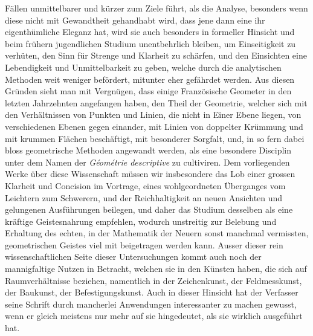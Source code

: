 %
Fällen unmittelbarer und kürzer zum Ziele führt, als die Analyse, besonders wenn diese nicht mit Gewandtheit gehandhabt wird, dass jene dann eine ihr eigenthümliche Eleganz hat, wird sie auch besonders in formeller Hinsicht und beim frühern jugendlichen Studium unentbehrlich bleiben, um Einseitigkeit zu verhüten, den Sinn für Strenge und Klarheit zu schärfen, und den Einsichten eine Lebendigkeit und Unmittelbarkeit zu geben, welche durch die analytischen Methoden weit weniger befördert, mitunter eher gefährdet werden. Aus diesen Gründen sieht man mit Vergnügen, dass einige Französische Geometer in den letzten Jahrzehnten angefangen haben, den Theil der Geometrie, welcher sich mit den Verhältnissen von Punkten und Linien, die nicht in Einer Ebene liegen, von verschiedenen Ebenen gegen einander, mit Linien von doppelter Krümmung und mit krummen Flächen beschäftigt, mit besonderer Sorgfalt, und, in so fern dabei bloss geometrische Methoden angewandt werden, als eine besondere Disciplin unter dem Namen der \textit{Géométrie descriptive} zu cultiviren. Dem vorliegenden Werke über diese Wissenschaft müssen wir insbesondere das Lob einer grossen Klarheit und Concision im Vortrage, eines wohlgeordneten Überganges vom Leichtern zum Schwerern, und der Reichhaltigkeit an neuen Ansichten und gelungenen Ausführungen beilegen, und daher das Studium desselben als eine kräftige Geistesnahrung empfehlen, wodurch unstreitig zur Belebung und Erhaltung des echten, in der Mathematik der Neuern sonst manchmal vermissten, geometrischen Geistes viel mit beigetragen werden kann. Ausser dieser rein wissenschaftlichen Seite dieser Untersuchungen kommt auch noch der mannigfaltige Nutzen in Betracht, welchen sie in den Künsten haben, die sich auf Raumverhältnisse beziehen, namentlich in der Zeichenkunst, der Feldmesskunst, der Baukunst, der Befestigungskunst. Auch in dieser Hinsicht hat der Verfasser seine Schrift durch mancherlei Anwendungen interessanter zu machen gewusst, wenn er gleich meistens nur mehr auf sie hingedeutet, als sie wirklich ausgeführt hat.
